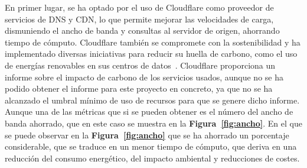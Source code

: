 En primer lugar, se ha optado por el uso de Cloudflare como proveedor de servicios de DNS y CDN, lo que permite mejorar las velocidades de carga, dismuniendo el ancho de banda y consultas al servidor de origen, ahorrando tiempo de cómputo. Cloudflare también se compromete con la sostenibilidad y ha implementado diversas iniciativas para reducir su huella de carbono, como el uso de energías renovables en sus centros de datos~\cite{SosCloudflare}. Cloudflare proporciona un informe sobre el impacto de carbono de los servicios usados, aunque no se ha podido obtener el informe para este proyecto en concreto, ya que no se ha alcanzado el umbral mínimo de uso de recursos para que se genere dicho informe. Aunque una de las métricas que si se pueden obtener es el número del ancho de banda ahorrado, que en este caso se muestra en la \textbf{Figura~\ref{fig:ancho}}.
En el que se puede observar en la \textbf{Figura~\ref{fig:ancho}} que se ha ahorrado un porcentaje considerable, que se traduce en un menor tiempo de cómputo, que deriva en una reducción del consumo energético, del impacto ambiental y reducciones de costes.



